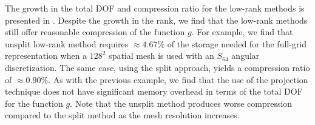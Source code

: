 \documentclass[onefignum,onetabnum]{siamart220329}
\begin{document}
The growth in the total DOF and compression ratio for the low-rank methods is presented in . Despite the growth in the rank, we find that the low-rank methods still offer reasonable compression of the function $g$. For example, we find that unsplit low-rank method requires $\approx 4.67\%$ of the storage needed for the full-grid representation when a $128^{2}$ spatial mesh is used with an $S_{64}$ angular discretization. The same case, using the split approach, yields a compression ratio of $\approx 0.90\%$. As with the previous example, we find that the use of the projection technique does not have significant memory overhead in terms of the total DOF for the function $g$. Note that the unsplit method produces worse compression compared to the split method as the mesh resolution increases.


























\end{document}
